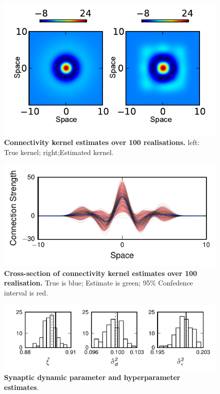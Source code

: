 \documentclass[]{article}
\begin{document}
\begin{figure}[!ht]
\begin{center}
\includegraphics{./Figures/KernelEstimate.pdf}
\end{center}
\caption{{\bf Connectivity kernel estimates over 100 realisations.} left: True kernel; right;Estimated kernel.}
\label{fig:KernelEstimates}
\end{figure}
\begin{figure}[!ht]
\begin{center}
\includegraphics{./Figures/KernelEstimateCrossSection.pdf}
\end{center}
\caption{{\bf Cross-section of connectivity kernel estimates over 100 realisation.} True is blue; Estimate is green; 95\% Confedence interval is red.}
\label{fig:KernelEstimateCrossSection}
\end{figure}
\begin{figure}[!ht]
\begin{center}
\includegraphics{./Figures/Histogram.pdf}
\end{center}
\caption{{\bf Synaptic dynamic parameter and hyperparameter estimates}.}
\label{fig:Histogram}
\end{figure}
\end{document}
